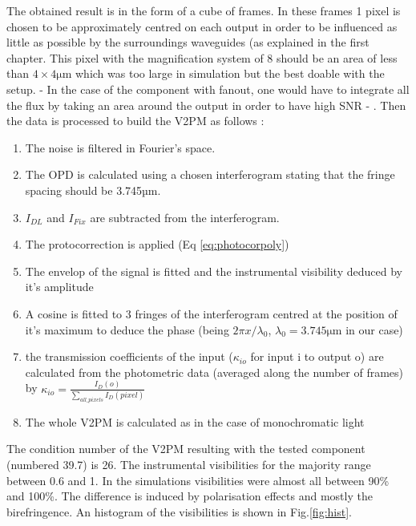 The obtained result is in the form of a cube of frames. In these frames 1 pixel is chosen to be approximately centred on each output in order to be influenced as little as possible by the surroundings waveguides (as explained in the first chapter. This pixel with the magnification system of 8 should be an area of less than $4\times 4 \si{\micro\meter}$ which was too large in simulation but the best doable with the setup. - In the case of the component with fanout, one would have to integrate all the flux by taking an area around the output in order to have high SNR - . Then the data is processed to build the V2PM as follows :
\begin{enumerate}
 \item The noise is filtered in Fourier's space.
 \item The OPD is calculated using a chosen interferogram stating that the fringe spacing should be 3.745µm.
 \item $I_{DL}$ and $I_{Fix}$ are subtracted from the interferogram.
 \item The protocorrection is applied (Eq \ref{eq:photocorpoly})
 \item The envelop of the signal is fitted and the instrumental visibility deduced by it's amplitude
 \item A cosine is fitted to 3 fringes of the interferogram centred at the position of it's maximum to deduce the phase (being $2\pi x/\lambda_0$, $\lambda_0 = 3.745\si{\micro\meter}$ in our case)
 \item the transmission coefficients of the input ($\kappa_{io}$ for input i to output o) are calculated from the photometric data (averaged along the number of frames) by $\kappa_{io} = \frac{I_D(o)}{\sum_{all\_pixels}{I_D(pixel)}}$
 \item The whole V2PM is calculated as in the case of monochromatic light
\end{enumerate}

The condition number of the V2PM resulting with the tested component (numbered 39.7) is 26. The instrumental visibilities for the majority range between 0.6 and 1. In the simulations visibilities were almost all between 90\% and 100\%. The difference is induced by polarisation effects and mostly the birefringence. An histogram of the visibilities is shown in Fig.\ref{fig:hist}. 

